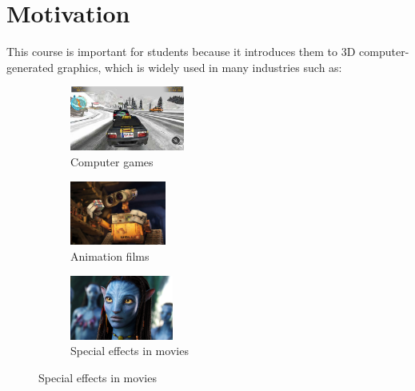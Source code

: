 \documentclass[11pt,a4paper]{article}
\begin{document}
\section{Motivation}

This course is important for students because it introduces them to 3D computer-generated graphics, which is widely used in many industries such as:

\begin{figure}[H]
 \begin{subfigure}{0.31\textwidth}
 \centering
 \includegraphics[height=80px,trim=20 0 20 0,clip]{images/racing_game.jpg}
 \caption{Computer games}
 \end{subfigure}
 \begin{subfigure}{0.31\textwidth}
 \centering
 \includegraphics[height=80px]{images/walle}
 \caption{Animation films}
 \end{subfigure}
 \begin{subfigure}{0.31\textwidth}
 \centering
 \includegraphics[height=80px]{images/avatar}
 \caption{Special effects in movies}
 \end{subfigure}
 \vspace{1em}
 

\end{figure}
\end{document}
